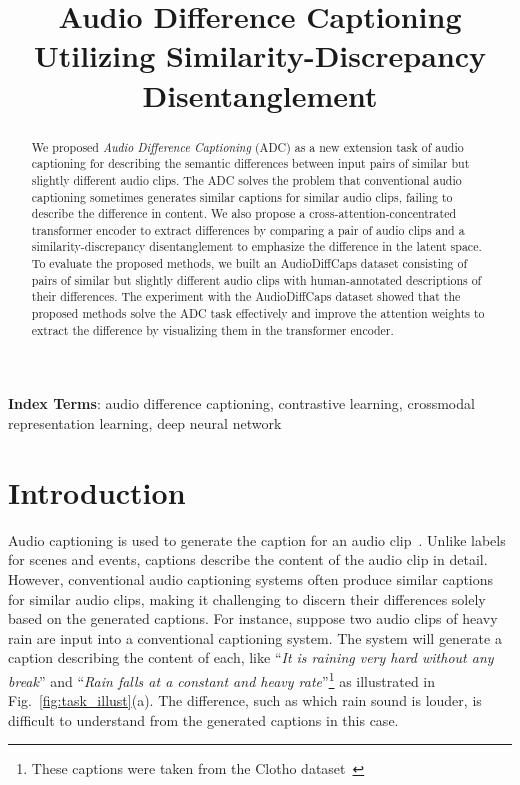 \title{Audio Difference Captioning \\ Utilizing Similarity-Discrepancy Disentanglement}



\sloppy

\maketitle
\ninept 
\begin{abstract}
We proposed \textit{Audio Difference Captioning} (ADC) as a new extension task of audio captioning for describing the semantic differences between input pairs of similar but slightly different audio clips.
The ADC solves the problem that conventional audio captioning sometimes generates similar captions for similar audio clips, failing to describe the difference in content.
We also propose a cross-attention-concentrated transformer encoder to extract differences by comparing a pair of audio clips and a similarity-discrepancy disentanglement to emphasize the difference in the latent space.
To evaluate the proposed methods, we built an AudioDiffCaps dataset consisting of pairs of similar but slightly different audio clips with human-annotated descriptions of their differences.
The experiment with the AudioDiffCaps dataset showed that the proposed methods solve the ADC task effectively and improve the attention weights to extract the difference by visualizing them in the transformer encoder.

\end{abstract}
\noindent\textbf{Index Terms}: audio difference captioning, contrastive learning, crossmodal representation learning, deep neural network

\section{Introduction}
\label{sec:intro} 

Audio captioning is used to generate the caption for an audio clip~\cite{kim2019audiocaps, drossos2019clotho, takeuchi2020effects, xu2020crnn, mei2021audio, gontier2021automated, koizumi2020audio, xu2022diversity, mei2022diverse, liu2022leveraging}.
Unlike labels for scenes and events\cite{piczak2015dataset, barchiesi2015acoustic, mesaros2016tut, gemmeke2017audio, fonseca2020fsd50k}, captions describe the content of the audio clip in detail.
However, conventional audio captioning systems often produce similar captions for similar audio clips, making it challenging to discern their differences solely based on the generated captions.
For instance, suppose two audio clips of heavy rain are input into a conventional captioning system. 
The system will generate a caption describing the content of each, like ``\textit{It is raining very hard without any break}'' and ``\textit{Rain falls at a constant and heavy rate}''\footnote{These captions were taken from the Clotho dataset~\cite{drossos2019clotho}} as illustrated in Fig.~\ref{fig:task_illust}(a). 
The difference, such as which rain sound is louder, is difficult to understand from the generated captions in this case.

